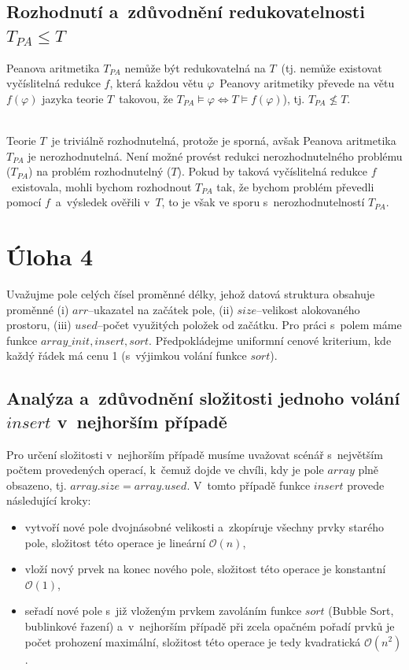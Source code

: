 \documentclass[a4paper, 11pt]{article}
\begin{document}
\subsection*{Rozhodnutí a~zdůvodnění redukovatelnosti $T_{PA} \leq T$}

Peanova aritmetika $T_{PA}$ nemůže být redukovatelná na $T$~(tj. nemůže existovat vyčíslitelná redukce $f$, která každou větu $\varphi$~Peanovy aritmetiky převede na větu $f(\varphi )$ jazyka teorie $T$~takovou, že $T_{PA} \models \varphi \Longleftrightarrow T \models f(\varphi )$), tj. $T_{PA} \nleq T$.

\noindent \\ Teorie $T$~je triviálně rozhodnutelná, protože je sporná, avšak Peanova aritmetika $T_{PA}$ je nerozhodnutelná.
Není možné provést redukci nerozhodnutelného problému ($T_{PA}$) na problém rozhodnutelný ($T$).
Pokud by taková vyčíslitelná redukce $f$~existovala, mohli bychom rozhodnout $T_{PA}$ tak, že bychom problém převedli pomocí $f$~a~výsledek ověřili v~$T$, to je však ve sporu s~nerozhodnutelností $T_{PA}$.

\newpage

\section*{Úloha 4}

Uvažujme pole celých čísel proměnné délky, jehož datová struktura obsahuje proměnné (i) $arr$–ukazatel na začátek pole, (ii) $size$–velikost alokovaného prostoru, (iii) $used$–počet využitých položek od začátku.
Pro práci s~polem máme funkce $array\_init, insert, sort$.
Předpokládejme uniformní cenové kriterium, kde každý řádek má cenu 1 (s~výjimkou volání funkce $sort$).

\subsection*{Analýza a~zdůvodnění složitosti jednoho volání $insert$ v~nejhorším případě}

Pro určení složitosti v~nejhorším případě musíme uvažovat scénář s~největším počtem provedených operací, k~čemuž dojde ve chvíli, kdy je pole $array$ plně obsazeno, tj. $array.size = array.used$.
V~tomto případě funkce $insert$ provede následující kroky:

\begin{itemize}
    \item vytvoří nové pole dvojnásobné velikosti a~zkopíruje všechny prvky starého pole, složitost této operace je lineární $\mathcal{O}(n)$,
    \item vloží nový prvek na konec nového pole, složitost této operace je konstantní $\mathcal{O}(1)$,
    \item seřadí nové pole s~již vloženým prvkem zavoláním funkce $sort$ (Bubble Sort, bublinkové řazení) a~v~nejhorším případě při zcela opačném pořadí prvků je počet prohození maximální, složitost této operace je tedy kvadratická $\mathcal{O}(n^2)$.
\end{itemize}
\end{document}
